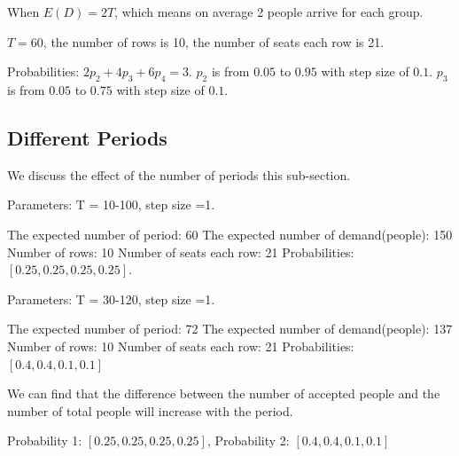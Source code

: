 % 

When $E(D) = 2T$, which means on average 2 people arrive for each group.

$T = 60$, the number of rows is 10, the number of seats each row is 21.

Probabilities: 
$2p_2 + 4p_3 + 6p_4 =3$. $p_2$ is from $0.05$ to $0.95$ with step size of $0.1$. $p_3$ is from $0.05$ to $0.75$ with step size of $0.1$.


% 


\subsection{Different Periods}
We discuss the effect of the number of periods this sub-section. 

Parameters: T = 10-100, step size =1.

The expected number of period: 60
The expected number of demand(people): 150
Number of rows: 10
Number of seats each row: 21
Probabilities: $[0.25, 0.25, 0.25, 0.25]$.

Parameters: T = 30-120, step size =1.

The expected number of period: 72
The expected number of demand(people): 137
Number of rows: 10
Number of seats each row: 21
Probabilities: $[0.4, 0.4, 0.1, 0.1]$


% 
% 



We can find that the difference between the number of accepted people and the number of total people will increase with the period. 

Probability 1: $[0.25, 0.25, 0.25, 0.25]$,
Probability 2: $[0.4, 0.4, 0.1, 0.1]$

